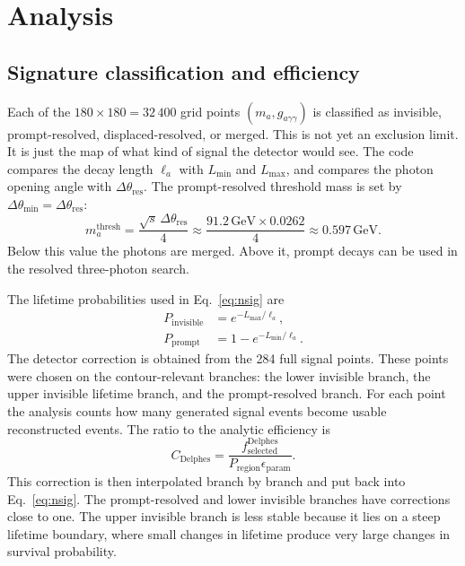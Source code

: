 \documentclass[12pt,a4paper]{article}
\begin{document}
\section{Analysis}
\label{sec:analysis}

\subsection{Signature classification and efficiency}

Each of the $180\times180 = 32\,400$ grid points $(m_{a}, g_{a\gamma\gamma})$ is
classified as invisible, prompt-resolved, displaced-resolved, or merged. This
is not yet an exclusion limit. It is just the map of what kind of signal the
detector would see. The code compares the decay length $\ell_a$ with
$L_\mathrm{min}$ and $L_\mathrm{max}$, and compares the photon opening angle
with $\Delta\theta_\mathrm{res}$. The prompt-resolved threshold mass is set by
$\Delta\theta_\mathrm{min} = \Delta\theta_\mathrm{res}$:
\begin{equation}
    m_{a}^\mathrm{thresh} = \frac{\sqrt{s}\,\Delta\theta_\mathrm{res}}{4}
    \approx \frac{91.2\,\text{GeV} \times 0.0262}{4} \approx 0.597\,\text{GeV}.
    \label{eq:threshold}
\end{equation}
Below this value the photons are merged. Above it, prompt decays can be used in
the resolved three-photon search.

The lifetime probabilities used in Eq.~\eqref{eq:nsig} are
\begin{align}
    P_\mathrm{invisible} &= e^{-L_\mathrm{max}/\ell_a},
    \label{eq:pinv}\\
    P_\mathrm{prompt} &= 1 - e^{-L_\mathrm{min}/\ell_a}.
    \label{eq:pprompt}
\end{align}
The detector correction is obtained from the 284 full signal points. These
points were chosen on the contour-relevant branches: the lower invisible
branch, the upper invisible lifetime branch, and the prompt-resolved branch.
For each point the analysis counts how many generated signal events become
usable reconstructed events. The ratio to the analytic efficiency is
\begin{equation}
    C_\mathrm{Delphes}
    =
    \frac{
      f_\mathrm{selected}^\mathrm{Delphes}
    }{
      P_\mathrm{region}\epsilon_\mathrm{param}
    }.
    \label{eq:delphes_correction}
\end{equation}
This correction is then interpolated branch by branch and put back into
Eq.~\eqref{eq:nsig}. The prompt-resolved and lower invisible branches have
corrections close to one. The upper invisible branch is less stable because it
lies on a steep lifetime boundary, where small changes in lifetime produce very
large changes in survival probability.
\end{document}
